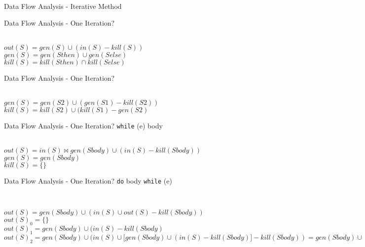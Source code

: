 \documentclass[mcgill,slideColor,colorBG,pdf]{prosper}
\begin{document}
\begin{slide} {Data Flow Analysis - Iterative Method}
\begin{center}
\end{center}
\end{slide}

\begin{slide} {Data Flow Analysis - One Iteration?}
\begin{center}
\end{center}
\ \\
$out(S) = gen(S) \cup (in(S) - kill(S))$\\
$gen(S) = gen(Sthen) \cup gen(Selse)$\\
$kill(S) = kill(Sthen) \cap kill(Selse)$
\end{slide}

\begin{slide} {Data Flow Analysis - One Iteration?}
\begin{center}
\end{center}
\ \\
$gen(S) = gen(S2) \cup (gen(S1) - kill(S2))$\\
$kill(S) = kill(S2) \cup (kill(S1) - gen(S2)$
\end{slide}

\begin{slide} {Data Flow Analysis - One Iteration?}
\texttt{while} (e) body
\begin{center}
\end{center}
\ \\
$out(S) = in(S) \bowtie gen(Sbody) \cup (in(S) - kill(Sbody))$\\
$gen(S) = gen(Sbody)$\\
$kill(S) = \{\}$
\end{slide}

\begin{slide} {Data Flow Analysis - One Iteration?}
\texttt{do} body \texttt{while} (e)
\begin{center}
\end{center}
\ \\
\begin{tiny}
$out(S) = gen(Sbody) \cup (in(S) \cup out(S) - kill(Sbody))$\\
$out(S)_0 = \{\}$\\
$out(S)_1 = gen(Sbody) \cup (in(S) - kill(Sbody)$\\
$out(S)_2 = gen(Sbody) \cup (in(S) \cup [ gen(Sbody) \cup (in(S) - kill(Sbody)] - kill(Sbody)) = gen(Sbody) \cup (in(S) - kill(Sbody))$
\end{tiny}
\end{slide}
\end{document}
